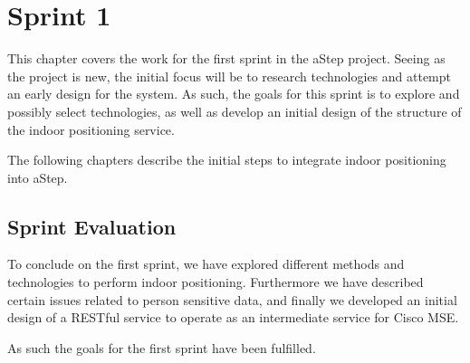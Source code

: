 \chapter{Sprint 1}
This chapter covers the work for the first sprint in the aStep project. Seeing as the project is new, the initial focus will be to research technologies and attempt an early design for the system. As such, the goals for this sprint is to explore and possibly select technologies, as well as develop an initial design of the structure of the indoor positioning service. 

The following chapters describe the initial steps to integrate indoor positioning into aStep.






\section{Sprint Evaluation}
To conclude on the first sprint, we have explored different methods and technologies to perform indoor positioning. Furthermore we have described certain issues related to person sensitive data, and finally we developed an initial design of a RESTful service to operate as an intermediate service for Cisco MSE. 

As such the goals for the first sprint have been fulfilled.